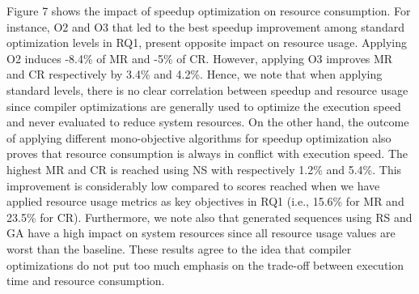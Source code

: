 Figure 7 shows the impact of speedup optimization on resource consumption. For instance, O2 and O3 that led to the best speedup improvement among standard optimization levels in RQ1, present opposite impact on resource usage. Applying O2 induces -8.4\% of MR and -5\% of CR. However, applying O3 improves MR and CR respectively by 3.4\% and 4.2\%. Hence, we note that when applying standard levels, there is no clear correlation between speedup and resource usage since compiler optimizations are generally used to optimize the execution speed and never evaluated to reduce system resources.
On the other hand, the outcome of applying different mono-objective algorithms for speedup optimization also proves that resource consumption is always in conflict with execution speed. The highest MR and CR is reached using NS with respectively 1.2\% and 5.4\%. This improvement is considerably low compared to scores reached when we have applied resource usage metrics as key objectives in RQ1 (i.e., 15.6\% for MR and 23.5\% for CR). Furthermore, we note also that generated sequences using RS and GA have a high impact on system resources since all resource usage values are worst than the baseline.
These results agree to the idea that compiler optimizations do not put too much emphasis on the trade-off between execution time and resource consumption.


